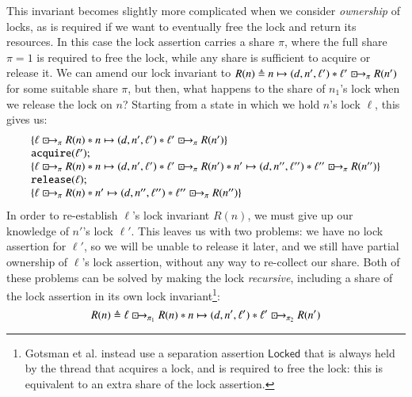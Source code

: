 \documentclass[runningheads]{llncs}
\newcommand{\islock}{\boxdotright}
\begin{document}
This invariant becomes slightly more complicated when we consider \emph{ownership} of locks, as is required if we want to eventually free the lock and return its resources. In this case the lock assertion carries a share $\pi$, where the full share $\pi = 1$ is required to free the lock, while any share is sufficient to acquire or release it. We can amend our lock invariant to $R(n) \triangleq n \mapsto (d, n', \ell') * \ell' \islock_\pi R(n')$ for some suitable share $\pi$, but then, what happens to the share of $n_1$'s lock when we release the lock on $n$? Starting from a state in which we hold $n$'s lock $\ell$, this gives us:
$$\begin{array}{l}
\{ \ell \islock_\pi R(n) * n \mapsto (d, n', \ell') * \ell' \islock_\pi R(n') \}\\
\texttt{acquire}(\ell');\\
\{ \ell \islock_\pi R(n) * n \mapsto (d, n', \ell') * \ell' \islock_\pi R(n') * n' \mapsto (d, n'', \ell'') * \ell'' \islock_\pi R(n'') \}\\
\texttt{release}(\ell);\\
\{ \ell \islock_\pi R(n) * n' \mapsto (d, n'', \ell'') * \ell'' \islock_\pi R(n'') \}
\end{array}$$
In order to re-establish $\ell$'s lock invariant $R(n)$, we must give up our knowledge of $n'$'s lock $\ell'$. This leaves us with two problems: we have no lock assertion for $\ell'$, so we will be unable to release it later, and we still have partial ownership of $\ell$'s lock assertion, without any way to re-collect our share. Both of these problems can be solved by making the lock \emph{recursive}, including a share of the lock assertion in its own lock invariant\footnote{Gotsman et al. instead use a separation assertion $\mathsf{Locked}$ that is always held by the thread that acquires a lock, and is required to free the lock: this is equivalent to an extra share of the lock assertion.}:
$$R(n) \triangleq \ell \islock_{\pi_1} R(n) * n \mapsto (d, n', \ell') * \ell' \islock_{\pi_2} R(n')$$
\end{document}
